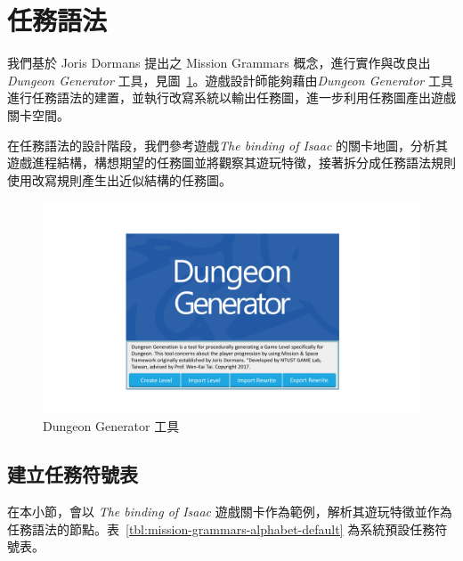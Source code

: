 \section{任務語法}
\label{sec:method-missiongrammars}

我們基於 Joris Dormans 提出之 Mission Grammars 概念，進行實作與改良出\textit{Dungeon Generator} 工具，見圖~\ref{fig:dungeon-generator}。遊戲設計師能夠藉由\textit{Dungeon Generator} 工具進行任務語法的建置，並執行改寫系統以輸出任務圖，進一步利用任務圖產出遊戲關卡空間。

在任務語法的設計階段，我們參考遊戲\textit{The binding of Isaac} 的關卡地圖，分析其遊戲進程結構，構想期望的任務圖並將觀察其遊玩特徵，接著拆分成任務語法規則使用改寫規則產生出近似結構的任務圖。

\begin{figure}[!htb]
  \begin{center}
    \includegraphics[width=1.0\textwidth]{figures/dungeon_generator.pdf}
    \caption{Dungeon Generator 工具} 
    \label{fig:dungeon-generator}
  \end{center}
\end{figure}

\subsection{建立任務符號表}
\label{ssec:method-missiongrammars-alphabet}

在本小節，會以 \textit{The binding of Isaac} 遊戲關卡作為範例，解析其遊玩特徵並作為任務語法的節點。表~\ref{tbl:mission-grammars-alphabet-default} 為系統預設任務符號表。

